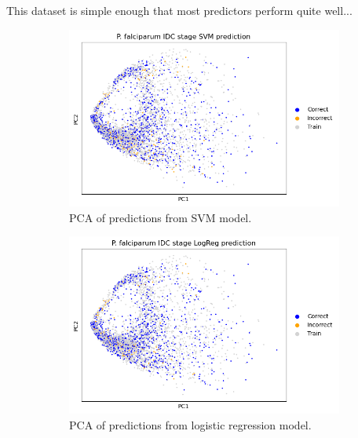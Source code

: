 \documentclass{article}
\begin{document}
This dataset is simple enough that most predictors perform quite well...

\begin{figure}[!h]
  \centering
  
  \begin{subfigure}[b]{0.3\textwidth}
      \includegraphics[width=\textwidth]{figures/pca_Pf_prediction_SVM.png}
      \caption{PCA of predictions from SVM model.}
      \label{fig:sub1}
  \end{subfigure}
  \hfill
  \begin{subfigure}[b]{0.3\textwidth}
      \includegraphics[width=\textwidth]{figures/pca_Pf_prediction_LogReg.png}
      \caption{PCA of predictions from logistic regression model.}
      \label{fig:sub2}
  \end{subfigure}
  \hfill
  \begin{subfigure}[b]{0.3\textwidth}

\end{subfigure}
\end{figure}
\end{document}
